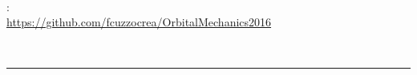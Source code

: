 \thispagestyle{empty}

\hfill
\vspace{5cm}
\strong{ }\\

\vfill

\begin{multicols}{2}
\medskip
{}: \\
\url{https://github.com/fcuzzocrea/OrbitalMechanics2016}


\medskip
\noindent{\sscap{}} \\
\mail{\myEmail}
\vfill
\columnbreak

\end{multicols}
\vspace{1cm}
\hrule
\bigskip
\clearpage
